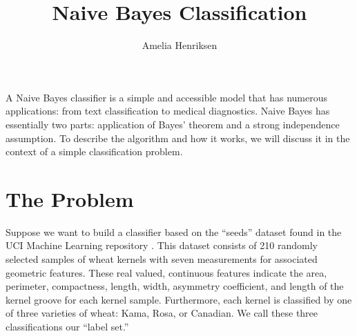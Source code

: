 \documentclass[12pt]{article}
\begin{document}
\title{Naive Bayes Classification}
\author{Amelia Henriksen}
\maketitle

A Naive Bayes classifier is a simple and accessible model that has numerous applications: from text classification to medical diagnostics. 
Naive Bayes has essentially two parts: application of Bayes' theorem and a strong independence assumption.
To describe the algorithm and how it works, we will discuss it in the context of a simple classification problem.
\section*{The Problem}
Suppose we want to build a classifier based on the ``seeds'' dataset found in the UCI Machine Learning repository \cite{Lichman}.
This dataset consists of 210 randomly selected samples of wheat kernels with seven measurements for associated geometric features.
These real valued, continuous features indicate the area, perimeter, compactness, length, width, asymmetry coefficient, and length of the kernel groove for each kernel sample.
Furthermore, each kernel is classified by one of three varieties of wheat: Kama, Rosa, or Canadian. 
We call these three classifications our ``label set.''
\end{document}
